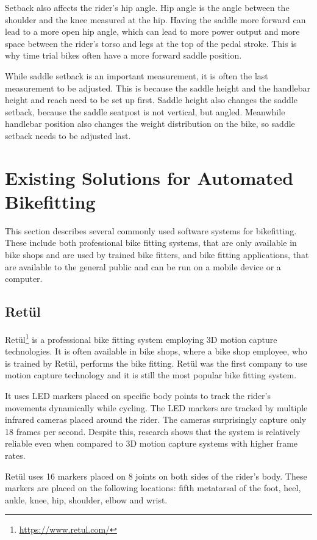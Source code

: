 Setback also affects the rider's hip angle. Hip angle is the angle between the shoulder and the knee measured at the hip. Having the saddle more forward can lead to a more open hip angle, which can lead to more power output and more space between the rider's torso and legs at the top of the pedal stroke. This is why time trial bikes often have a more forward saddle position.

While saddle setback is an important measurement, it is often the last measurement to be adjusted. This is because the saddle height and the handlebar height and reach need to be set up first. Saddle height also changes the saddle setback, because the saddle seatpost is not vertical, but angled. Meanwhile handlebar position also changes the weight distribution on the bike, so saddle setback needs to be adjusted last.



\section{Existing Solutions for Automated Bikefitting}
This section describes several commonly used software systems for bikefitting. These include both professional bike fitting systems, that are only available in bike shops and are used by trained bike fitters, and bike fitting applications, that are available to the general public and can be run on a mobile device or a computer.

\subsection{Retül}
Retül\footnote{\url{https://www.retul.com/}} is a professional bike fitting system employing 3D motion capture technologies. It is often available in bike shops, where a bike shop employee, who is trained by Retül, performs the bike fitting. Retül was the first company to use motion capture technology and it is still the most popular bike fitting system.

It uses LED markers placed on specific body points to track the rider's movements dynamically while cycling. The LED markers are tracked by multiple infrared cameras placed around the rider. The cameras surprisingly capture only 18 frames per second. Despite this, research \cite{retulReliability} shows that the system is relatively reliable even when compared to 3D motion capture systems with higher frame rates.

Retül uses 16 markers placed on 8 joints on both sides of the rider's body. These markers are placed on the following locations: fifth metatarsal of the foot, heel, ankle, knee, hip, shoulder, elbow and wrist.


